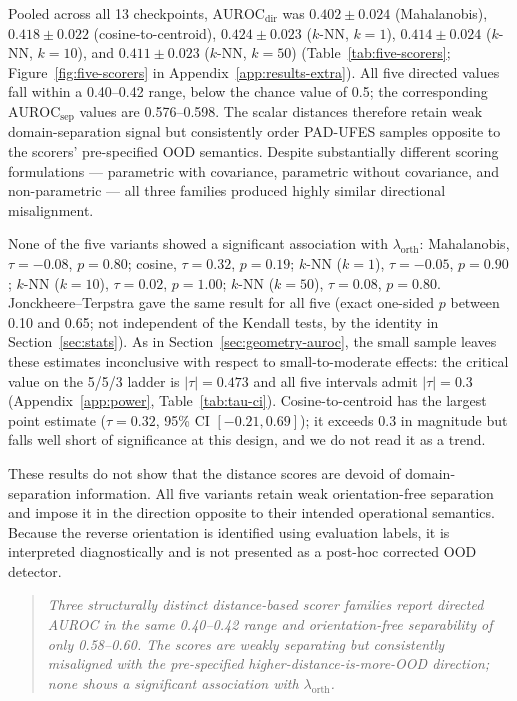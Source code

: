 Pooled across all 13 checkpoints, $\mathrm{AUROC}_{\mathrm{dir}}$ was $0.402 \pm 0.024$ (Mahalanobis), $0.418 \pm 0.022$ (cosine-to-centroid), $0.424 \pm 0.023$ ($k$-NN, $k=1$), $0.414 \pm 0.024$ ($k$-NN, $k=10$), and $0.411 \pm 0.023$ ($k$-NN, $k=50$) (Table~\ref{tab:five-scorers}; Figure~\ref{fig:five-scorers} in Appendix~\ref{app:results-extra}). All five directed values fall within a 0.40--0.42 range, below the chance value of 0.5; the corresponding $\mathrm{AUROC}_{\mathrm{sep}}$ values are 0.576--0.598. The scalar distances therefore retain weak domain-separation signal but consistently order PAD-UFES samples opposite to the scorers' pre-specified OOD semantics. Despite substantially different scoring formulations --- parametric with covariance, parametric without covariance, and non-parametric --- all three families produced highly similar directional misalignment.

None of the five variants showed a significant association with $\lambda_{\mathrm{orth}}$: Mahalanobis, $\tau = -0.08$, $p = 0.80$; cosine, $\tau = 0.32$, $p = 0.19$; $k$-NN ($k=1$), $\tau = -0.05$, $p = 0.90$; $k$-NN ($k=10$), $\tau = 0.02$, $p = 1.00$; $k$-NN ($k=50$), $\tau = 0.08$, $p = 0.80$. Jonckheere--Terpstra gave the same result for all five (exact one-sided $p$ between 0.10 and 0.65; not independent of the Kendall tests, by the identity in Section~\ref{sec:stats}). As in Section~\ref{sec:geometry-auroc}, the small sample leaves these estimates inconclusive with respect to small-to-moderate effects: the critical value on the 5/5/3 ladder is $|\tau| = 0.473$ and all five intervals admit $|\tau| = 0.3$ (Appendix~\ref{app:power}, Table~\ref{tab:tau-ci}). Cosine-to-centroid has the largest point estimate ($\tau = 0.32$, 95\% CI $[-0.21, 0.69]$); it exceeds $0.3$ in magnitude but falls well short of significance at this design, and we do not read it as a trend.

These results do not show that the distance scores are devoid of domain-separation information. All five variants retain weak orientation-free separation and impose it in the direction opposite to their intended operational semantics. Because the reverse orientation is identified using evaluation labels, it is interpreted diagnostically and is not presented as a post-hoc corrected OOD detector.

\begin{quote}
\emph{Three structurally distinct distance-based scorer families report directed AUROC in the same 0.40--0.42 range and orientation-free separability of only 0.58--0.60. The scores are weakly separating but consistently misaligned with the pre-specified higher-distance-is-more-OOD direction; none shows a significant association with $\lambda_{\mathrm{orth}}$.}
\end{quote}

